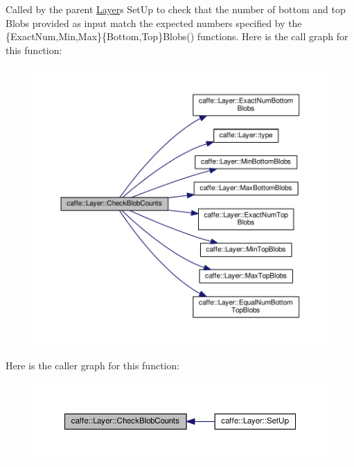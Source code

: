 Called by the parent \mbox{\hyperlink{classcaffe_1_1_layer}{Layer}}\textquotesingle{}s Set\+Up to check that the number of bottom and top Blobs provided as input match the expected numbers specified by the \{Exact\+Num,Min,Max\}\{Bottom,Top\}Blobs() functions. Here is the call graph for this function\+:
\nopagebreak
\begin{figure}[H]
\begin{center}
\leavevmode
\includegraphics[width=350pt]{classcaffe_1_1_layer_a55c8036130225fbc874a986bdf4b27e2_cgraph}
\end{center}
\end{figure}
Here is the caller graph for this function\+:
\nopagebreak
\begin{figure}[H]
\begin{center}
\leavevmode
\includegraphics[width=350pt]{classcaffe_1_1_layer_a55c8036130225fbc874a986bdf4b27e2_icgraph}
\end{center}
\end{figure}
\mbox{\label{classcaffe_1_1_layer_af452a938bc7596f9b5e9900c8dc4ab3d}} 
